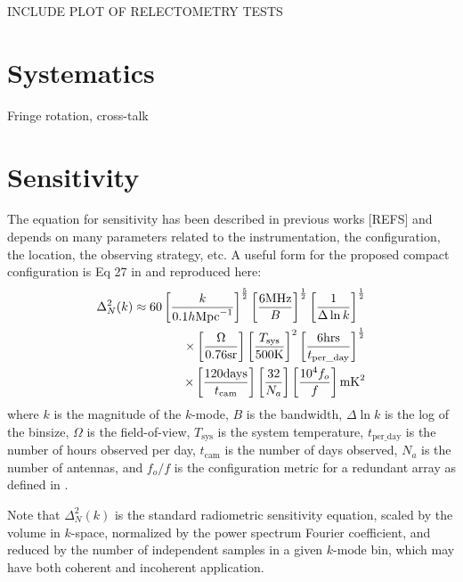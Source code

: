 \documentclass[11pt]{article}
\begin{document}
INCLUDE PLOT OF RELECTOMETRY TESTS

\section{Systematics}
Fringe rotation, cross-talk

\section{Sensitivity}
The equation for sensitivity has been described in previous works [REFS] and depends on many parameters
related to the instrumentation, the configuration, the location, the observing strategy, etc.  A useful form for 
the proposed compact configuration is Eq 27 in \citep{Parsonsetal2012} and reproduced here:
\begin{equation}
\centering
\label{eq:sensitivity}
\begin{split}
\Delta^2_N(k) \approx 60 \left[\frac{k}{0.1h\text{Mpc}^{-1}}\right]^\frac{5}{2}
                                         \left[\frac{6 \text{MHz}}{B}\right]^\frac{1}{2}
                                         \left[\frac{1}{\Delta\ln k}\right]^\frac{1}{2} \\
                        \times       \left[\frac{\Omega}{0.76\text{sr}}\right]
                                         \left[\frac{T_\text{sys}}{500 \text{K}}\right]^2
                                         \left[\frac{6 \text{hrs}}{t_\text{per\_day}}\right]^\frac{1}{2} \\
                        \times       \left[\frac{120\text{days}}{t_{\text{cam}}}\right]
                                         \left[\frac{32}{N_a}\right]
                                         \left[\frac{\text{10}^4f_o}{f}\right]  \text{mK}^2
\end{split}
\end{equation}
where $k$ is the magnitude of the $k$-mode, $B$ is the bandwidth, $\Delta\ln k$ is the log
of the binsize, $\Omega$ is the field-of-view, $T_{\text{sys}}$ is the system temperature, 
${t_\text{per\_day}}$ is the number of hours observed per day, $t_{\text{cam}}$ is the number of days
observed, $N_a$ is the number of antennas, and $f_o/f$ is the configuration metric for a 
redundant array as defined in \citep{Parsonsetal2012}.

Note that $\Delta^2_N(k)$ is the standard radiometric sensitivity equation, scaled by
the volume in $k$-space, normalized by the power spectrum Fourier coefficient, and
reduced by the number of independent samples in a given $k$-mode bin, which may have
both coherent and incoherent application.
\end{document}
